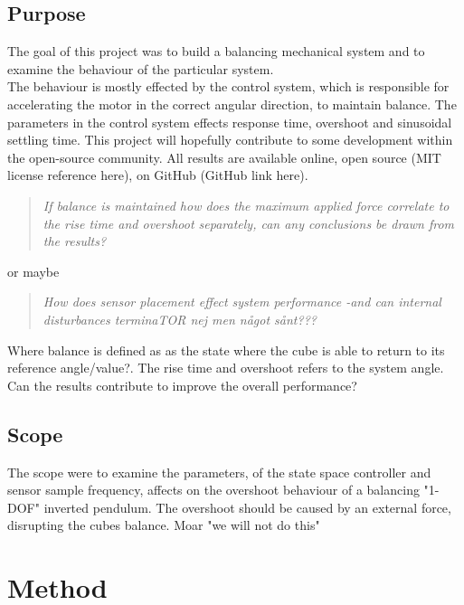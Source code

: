 \documentclass[a4paper,11pt]{kth-mag}
\newenvironment{italicquotes}
{\begin{quote}\itshape}
{\end{quote}}
\begin{document}
\section{Purpose}
The goal of this project was to build a balancing mechanical system and to examine the behaviour of the particular system.\\
The behaviour is mostly effected by the control system, which is responsible for accelerating the motor in the  correct angular direction, to maintain balance. The parameters in the control system effects response time, overshoot and sinusoidal settling time.
This project will hopefully contribute to some development within the open-source community.
All results are available online, open source (MIT license reference here), on GitHub (GitHub link here).\\ 
\begin{italicquotes}
If balance is maintained how does the maximum applied force correlate to the rise time and overshoot separately, can any conclusions be drawn from the results?
\end{italicquotes}
or maybe
\begin{italicquotes}
How does sensor placement effect system performance -and can internal disturbances terminaTOR nej men något sånt???
\end{italicquotes}
Where balance is defined as as the state where the cube is able to return to its reference angle/value?. The rise time and overshoot refers to the system angle. Can the results contribute to improve the overall performance?


\section{Scope}
The scope were to examine the parameters, of the state space controller and sensor sample frequency, affects on the overshoot behaviour of a balancing "1-DOF" inverted pendulum.
The overshoot should be caused by an external force, disrupting the cubes balance.
Moar "we will not do this"

\chapter{Method}
\end{document}
